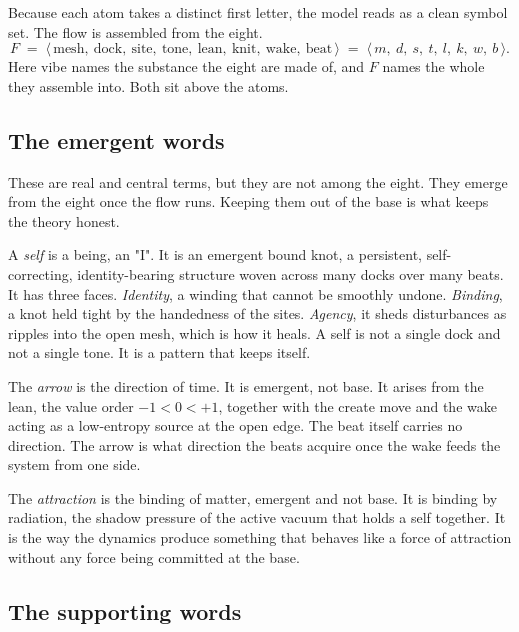 Because each atom takes a distinct first letter, the model reads as a clean symbol set. The flow is assembled from the eight.
\[
F \;=\; \langle\, \text{mesh},\ \text{dock},\ \text{site},\ \text{tone},\ \text{lean},\ \text{knit},\ \text{wake},\ \text{beat} \,\rangle
\;=\; \langle\, m,\ d,\ s,\ t,\ l,\ k,\ w,\ b \,\rangle.
\]
Here vibe names the substance the eight are made of, and $F$ names the whole they assemble into. Both sit above the atoms.

\subsection{The emergent words}

These are real and central terms, but they are not among the eight. They emerge from the eight once the flow runs. Keeping them out of the base is what keeps the theory honest.

\begin{definition}[Self]
A \emph{self} is a being, an "I". It is an emergent bound knot, a persistent, self-correcting, identity-bearing structure woven across many docks over many beats. It has three faces. \emph{Identity}, a winding that cannot be smoothly undone. \emph{Binding}, a knot held tight by the handedness of the sites. \emph{Agency}, it sheds disturbances as ripples into the open mesh, which is how it heals. A self is not a single dock and not a single tone. It is a pattern that keeps itself.
\end{definition}

\begin{definition}
The \emph{arrow} is the direction of time. It is emergent, not base. It arises from the lean, the value order $-1 < 0 < +1$, together with the create move and the wake acting as a low-entropy source at the open edge. The beat itself carries no direction. The arrow is what direction the beats acquire once the wake feeds the system from one side.
\end{definition}

\begin{definition}
The \emph{attraction} is the binding of matter, emergent and not base. It is binding by radiation, the shadow pressure of the active vacuum that holds a self together. It is the way the dynamics produce something that behaves like a force of attraction without any force being committed at the base.
\end{definition}

\subsection{The supporting words}

